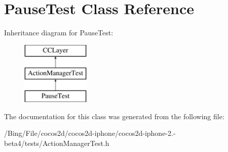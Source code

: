 \hypertarget{interface_pause_test}{\section{Pause\-Test Class Reference}
\label{interface_pause_test}
}
Inheritance diagram for Pause\-Test\-:\begin{figure}[H]
\begin{center}
\leavevmode
\includegraphics[height=3.000000cm]{interface_pause_test}
\end{center}
\end{figure}


The documentation for this class was generated from the following file\-:\begin{DoxyCompactItemize}
\item 
/\-Bing/\-File/cocos2d/cocos2d-\/iphone/cocos2d-\/iphone-\/2.-\/beta4/tests/Action\-Manager\-Test.\-h\end{DoxyCompactItemize}

